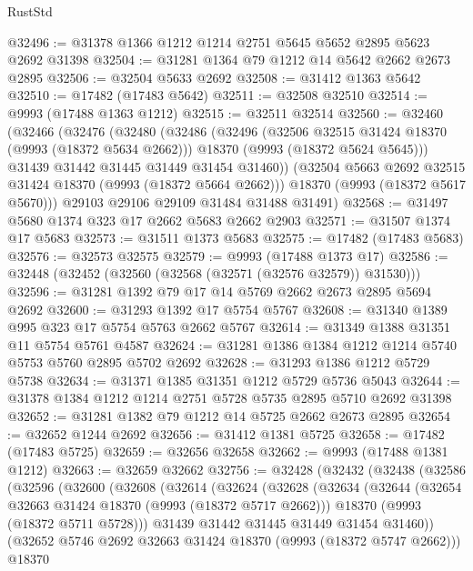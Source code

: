 \begin{lexlean}{RustStd}
\begin{coremodule}
@32496 := @31378 @1366 @1212 @1214 @2751 @5645 @5652 @2895 @5623 @2692 @31398
@32504 := @31281 @1364 @79 @1212 @14 @5642 @2662 @2673 @2895
@32506 := @32504 @5633 @2692
@32508 := @31412 @1363 @5642
@32510 := @17482 (@17483 @5642)
@32511 := @32508 @32510
@32514 := @9993 (@17488 @1363 @1212)
@32515 := @32511 @32514
@32560 := @32460
    (@32466
      (@32476
        (@32480
          (@32486
            (@32496
              (@32506 @32515 @31424 @18370 (@9993 (@18372 @5634 @2662)))
              @18370
              (@9993 (@18372 @5624 @5645)))
            @31439
            @31442
            @31445
            @31449
            @31454
            @31460))
        (@32504 @5663 @2692 @32515 @31424 @18370 (@9993 (@18372 @5664 @2662)))
        @18370
        (@9993 (@18372 @5617 @5670)))
      @29103
      @29106
      @29109
      @31484
      @31488
      @31491)
@32568 := @31497 @5680 @1374 @323 @17 @2662 @5683 @2662 @2903
@32571 := @31507 @1374 @17 @5683
@32573 := @31511 @1373 @5683
@32575 := @17482 (@17483 @5683)
@32576 := @32573 @32575
@32579 := @9993 (@17488 @1373 @17)
@32586 := @32448 (@32452 (@32560 (@32568 (@32571 (@32576 @32579)) @31530)))
@32596 := @31281 @1392 @79 @17 @14 @5769 @2662 @2673 @2895 @5694 @2692
@32600 := @31293 @1392 @17 @5754 @5767
@32608 := @31340 @1389 @995 @323 @17 @5754 @5763 @2662 @5767
@32614 := @31349 @1388 @31351 @11 @5754 @5761 @4587
@32624 := @31281 @1386 @1384 @1212 @1214 @5740 @5753 @5760 @2895 @5702 @2692
@32628 := @31293 @1386 @1212 @5729 @5738
@32634 := @31371 @1385 @31351 @1212 @5729 @5736 @5043
@32644 := @31378 @1384 @1212 @1214 @2751 @5728 @5735 @2895 @5710 @2692 @31398
@32652 := @31281 @1382 @79 @1212 @14 @5725 @2662 @2673 @2895
@32654 := @32652 @1244 @2692
@32656 := @31412 @1381 @5725
@32658 := @17482 (@17483 @5725)
@32659 := @32656 @32658
@32662 := @9993 (@17488 @1381 @1212)
@32663 := @32659 @32662
@32756 := @32428
    (@32432
      (@32438
        (@32586
          (@32596
            (@32600
              (@32608
                (@32614
                  (@32624
                    (@32628
                      (@32634
                        (@32644
                          (@32654 @32663 @31424 @18370 (@9993 (@18372 @5717 @2662)))
                          @18370
                          (@9993 (@18372 @5711 @5728)))
                        @31439
                        @31442
                        @31445
                        @31449
                        @31454
                        @31460))
                    (@32652 @5746 @2692 @32663 @31424 @18370 (@9993 (@18372 @5747 @2662)))
                    @18370

\end{coremodule}
\end{lexlean}
